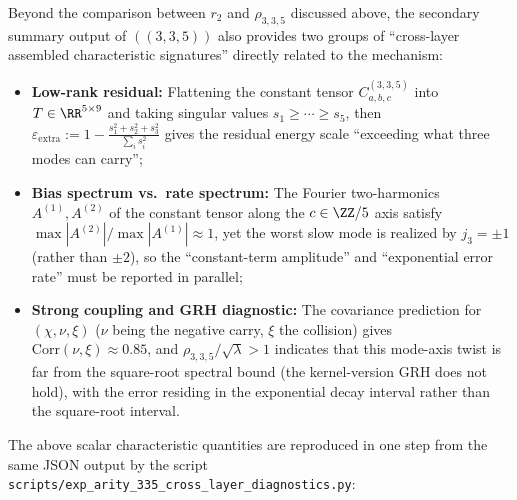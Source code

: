 \begin{remark}\label{rem:arity-335-cross-layer-diagnostics}
Beyond the comparison between \(r_2\) and \(\rho_{3,3,5}\) discussed above, the secondary summary output of \(((3,3,5))\) also provides two groups of ``cross-layer assembled characteristic signatures'' directly related to the mechanism:
\begin{itemize}
  \item \textbf{Low-rank residual:} Flattening the constant tensor \(C^{(3,3,5)}_{a,b,c}\) into \(T\in\RR^{5\times 9}\) and taking singular values \(s_1\ge\cdots\ge s_5\), then
  \(
  \varepsilon_{\mathrm{extra}}
  :=1-\frac{s_1^2+s_2^2+s_3^2}{\sum_i s_i^2}
  \)
  gives the residual energy scale ``exceeding what three modes can carry'';
  \item \textbf{Bias spectrum vs.\ rate spectrum:} The Fourier two-harmonics \(A^{(1)},A^{(2)}\) of the constant tensor along the \(c\in\ZZ/5\) axis satisfy \(\max|A^{(2)}|/\max|A^{(1)}|\approx 1\), yet the worst slow mode is realized by \(j_3=\pm 1\) (rather than \(\pm 2\)), so the ``constant-term amplitude'' and ``exponential error rate'' must be reported in parallel;
  \item \textbf{Strong coupling and GRH diagnostic:} The covariance prediction for \((\chi,\nu,\xi)\) (\(\nu\) being the negative carry, \(\xi\) the collision) gives \(\mathrm{Corr}(\nu,\xi)\approx 0.85\), and \(\rho_{3,3,5}/\sqrt{\lambda}>1\) indicates that this mode-axis twist is far from the square-root spectral bound (the kernel-version GRH does not hold), with the error residing in the exponential decay interval rather than the square-root interval.
\end{itemize}
The above scalar characteristic quantities are reproduced in one step from the same JSON output by the script \texttt{scripts/exp\_arity\_335\_cross\_layer\_diagnostics.py}:

\end{remark}

